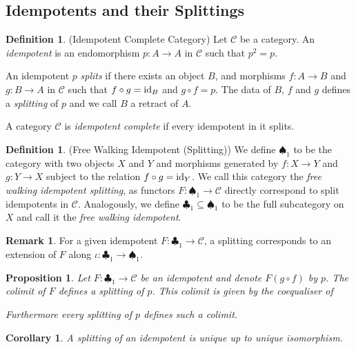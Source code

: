 \documentclass[12pt,oneside,reqno,a4paper]{article}
\newtheorem{corollary}[theorem]{Corollary}
\newtheorem{proposition}[theorem]{Proposition}
\theoremstyle{definition}
\newtheorem{definition}[theorem]{Definition}
\newtheorem{remark}[theorem]{Remark}
\newcommand{\clb}{\clubsuit}
\newcommand{\spd}{\spadesuit}
\newcommand{\id}{\textup{id}}
\newcommand{\C}{\mathcal{C}}
\begin{document}
\subsection{Idempotents and their Splittings}

\begin{definition}{(Idempotent Complete Category)}
Let $\C$ be a category. An \textit{idempotent} is an endomorphism $p:A\to A$ in $\C$ such that $p^2=p$.

An idempotent $p$ \textit{splits} if there exists an object $B$, and morphisms $f:A\to B$ and $g:B\to A$ in $\C$ such that $f\circ g=\id_B$ and $g\circ f=p$. The data of $B$, $f$ and $g$ defines a \textit{splitting} of $p$ and we call $B$ a retract of $A$.

A category $\C$ is \textit{idempotent complete} if every idempotent in it splits.
\end{definition}

\begin{definition}{(Free Walking Idempotent (Splitting))}
We define $\spd_1$ to be the category with two objects $X$ and $Y$ and morphisms generated by $f:X\to Y$ and $g:Y\to X$ subject to the relation $f\circ g=\id_Y$. We call this category the \textit{free walking idempotent splitting}, as functors $F:\spd_1\to\C$ directly correspond to split idempotents in $\C$. Analogously, we define $\clb_1\subseteq\spd_1$ to be the full subcategory on $X$ and call it the \textit{free walking idempotent}.
\end{definition}

\begin{remark}
For a given idempotent $F:\clb_1\to\C$, a splitting corresponds to an extension of $F$ along $\iota:\clb_1\to\spd_1$.
\end{remark}

\begin{proposition}\label{spliscol}
Let $F:\clb_1\to\C$ be an idempotent and denote $F(g\circ f)$ by $p$. The  colimit of $F$ defines a splitting of $p$. This colimit is given by the coequaliser of
\begin{center}
\end{center}
Furthermore every splitting of $p$ defines such a colimit.
\end{proposition}

\begin{corollary}
A splitting of an idempotent is unique up to unique isomorphism.
\end{corollary}
\end{document}
